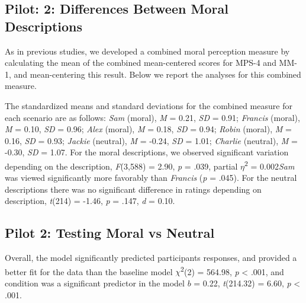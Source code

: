 \documentclass[
  american,
  man,mask,floatsintext]{apa6}
\begin{document}
\hypertarget{pilot-2-differences-between-moral-descriptions}{%
\subsection{Pilot: 2: Differences Between Moral Descriptions}\label{pilot-2-differences-between-moral-descriptions}}

As in previous studies, we developed a combined moral perception measure by calculating the mean of the combined mean-centered scores for MPS-4 and MM-1, and mean-centering this result. Below we report the analyses for this combined measure.

The standardized means and standard deviations for the combined measure for each scenario are as follows:
\emph{Sam} (moral),
\emph{M} = 0.21, \emph{SD} = 0.91;
\emph{Francis} (moral),
\emph{M} = 0.10, \emph{SD} = 0.96;
\emph{Alex} (moral),
\emph{M} = 0.18, \emph{SD} = 0.94;
\emph{Robin} (moral),
\emph{M} = 0.16, \emph{SD} = 0.93;
\emph{Jackie} (neutral),
\emph{M} = -0.24, \emph{SD} = 1.01;
\emph{Charlie} (neutral),
\emph{M} = -0.30, \emph{SD} = 1.07. For the moral descriptions, we observed significant variation depending on the description, \emph{F}(3,588) = 2.90, \emph{p} = .039, partial \(\eta\)\textsuperscript{2} = 0.002\emph{Sam} was viewed significantly more favorably than \emph{Francis} (\emph{p} = .045). For the neutral descriptions there was no significant difference in ratings depending on description, \emph{t}(214) = -1.46, \emph{p} = .147, \emph{d} = 0.10.

\newpage

\hypertarget{pilot-2-testing-moral-vs-neutral}{%
\subsection{Pilot 2: Testing Moral vs Neutral}\label{pilot-2-testing-moral-vs-neutral}}

Overall, the model significantly predicted participants responses, and provided a better fit for the data than the baseline model \(\chi\)\textsuperscript{2}(2) = 564.98, \emph{p} \textless{} .001, and condition was a significant predictor in the model \(b\) = 0.22, \emph{t}(214.32) = 6.60, \emph{p} \textless{} .001.
\end{document}
